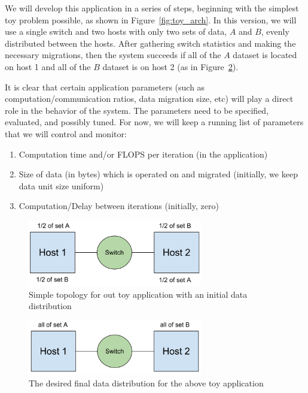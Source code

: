 \documentclass[12pt]{article}
\begin{document}
We will develop this application in a series of steps, beginning with the simplest toy problem possible, 
as shown in Figure~\ref{fig:toy_arch}.
In this version, we will use a single switch and two hosts with only two sets of data, $A$ and $B$, evenly
distributed between the hosts.  After gathering switch statistics and making the necessary migrations, then
the system succeeds if all of the $A$ dataset is located on host 1 and all of the $B$ dataset is on host 2
(as in Figure~\ref{fig:toy2}).

It is clear that certain application parameters (such as computation/communication ratios, data migration size,
etc) will play a direct role in the behavior of the system.  The parameters need to be specified, evaluated, and
possibly tuned.  For now, we will keep a running list of parameters that we will control and monitor:
\begin{enumerate}
  \item Computation time and/or FLOPS per iteration (in the application)
  \item Size of data (in bytes) which is operated on and migrated (initially, we keep data unit size uniform)
  \item Computation/Delay between iterations (initially, zero)
\end{enumerate}

\begin{figure}[t]
\centerline{\includegraphics[width=3.0in]{img/toy1.png}}
\caption{Simple topology for out toy application with an initial data distribution}
\label{fig:toy1}
\end{figure}

\begin{figure}[t]
\centerline{\includegraphics[width=3.0in]{img/toy2.png}}
\caption{The desired final data distribution for the above toy application}
\label{fig:toy2}
\end{figure}
\end{document}

